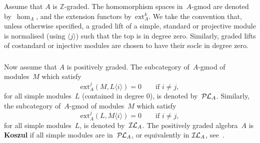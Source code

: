 \documentclass[11pt]{amsart}
\newcommand{\PL}{\mathcal{P}\hspace{-0.15mm}\mathcal{L}}
\newcommand{\IL}{\mathcal{I}\hspace{-0.15mm}\mathcal{L}}
\newcommand{\ext}{\mathrm{ext}}
\newcommand{\GG}{\mathscr{G}}
\newcommand{\mk}{\Bbbk}
\newcommand{\mZ}{\mathbb{Z}}
\numberwithin{equation}{section}
\theoremstyle{plain}
\theoremstyle{remark}
\theoremstyle{remark}
\theoremstyle{construction}
\begin{document}
\subsubsection{} %
Assume that $A$ is $\mZ$-graded.
The homomorphism spaces in~$A$-gmod are denoted by~$\hom_A${,} and the extension functors by~$\ext^k_A$. %
We take the convention that, unless otherwise specified, a graded lift of a simple, standard or projective module is normalised (using $\langle j\rangle$) such that the top is in degree zero. Similarly, graded lifts of costandard {or} injective modules are chosen to have their socle in degree zero.





\subsubsection{} Now assume that $A$ is positively graded. The subcategory of~$A$-gmod of modules~$M$ which satisfy
$$\ext^j_A(M,L\langle i\rangle)=0\qquad\mbox{if $i\not=j$},$$
for all simple modules~$L$ (contained in degree $0$), is denoted by~$\PL_A$. Similarly, the subcategory of~$A$-gmod of modules~$M$ which satisfy
$$\ext^j_A(L,M\langle i\rangle)=0\qquad\mbox{if $i\not=j$},$$
for all simple modules~$L$, is denoted by~$\IL_A$.
 The positively graded algebra~$A$ is {\bf Koszul} if all simple modules are in~$\PL_A$, or equivalently in $\IL_A$, see~\cite[Proposition~2.1.3]{BGS}. 
\end{document}
